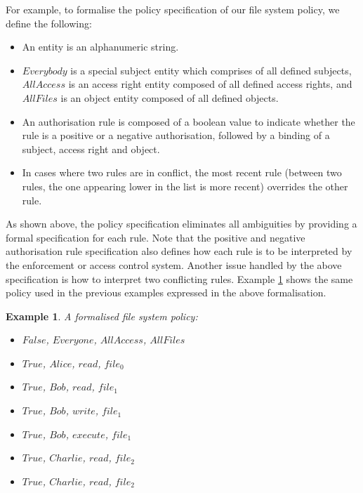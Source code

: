 \documentclass[11pt]{report}
\newtheorem{vexample}{Example}[chapter]
\begin{document}
        For example, to formalise the policy specification of our file system
        policy, we define the following:

        \begin{itemize}
          \item
            An entity is an alphanumeric string.
          \item
            $Everybody$ is a special subject entity which comprises of all
            defined subjects, $AllAccess$ is an access right entity
            composed of all defined access rights, and $AllFiles$ is an object
            entity composed of all defined objects.
          \item
            An authorisation rule is composed of a boolean value to indicate
            whether the rule is a positive or a negative authorisation,
            followed by a binding of a subject, access right and object.
          \item
            In cases where two rules are in conflict, the most recent rule
            (between two rules, the one appearing lower in the list is more
            recent) overrides the other rule.
        \end{itemize}

        As shown above, the policy specification eliminates all ambiguities
        by providing a formal specification for each rule. Note that the
        positive and negative authorisation rule specification also defines how
        each rule is to be interpreted by the enforcement or access control
        system. Another issue handled by the above specification is how to
        interpret two conflicting rules. Example \ref{exam-intro-poli3} shows
        the same policy used in the previous examples expressed in the above
        formalisation.

        \begin{vexample}
          \label{exam-intro-poli3}
          A formalised file system policy:
          \begin{itemize}
            \item
              $False$, $Everyone$, $AllAccess$, $AllFiles$
            \item
              $True$, $Alice$, $read$, $file_0$
            \item
              $True$, $Bob$, $read$, $file_1$
            \item
              $True$, $Bob$, $write$, $file_1$
            \item
              $True$, $Bob$, $execute$, $file_1$
            \item
              $True$, $Charlie$, $read$, $file_2$
            \item
              $True$, $Charlie$, $read$, $file_2$
          \end{itemize}
        \end{vexample}
         
\end{document}

